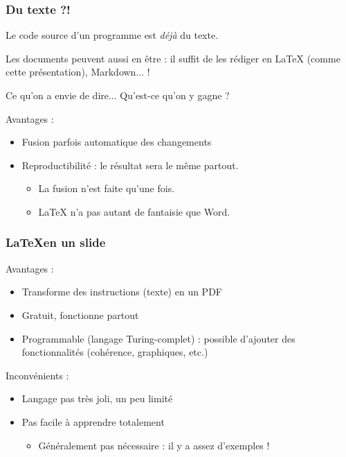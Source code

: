 \documentclass[compress]{beamer}
\newenvironment{envie}
	{\begin{block}{Ce qu'on a envie de dire...}}
	{\end{block}}
\begin{document}
\begin{frame}
	\frametitle{Du texte ?!}
	Le code source d'un programme est \emph{déjà} du texte.
	\pause

	Les documents peuvent aussi en être : il suffit de les rédiger en
	\LaTeX{} (comme cette présentation), Markdown... !
	\pause

	\begin{envie}
		Qu'est-ce qu'on y gagne ? \pause
	\end{envie}

	Avantages :
	\begin{itemize}
		\item Fusion parfois automatique des changements \pause
		\item Reproductibilité : le résultat sera le même partout. \pause
			\begin{itemize}
				\item La fusion n'est faite qu'une fois. \pause
				\item \LaTeX{} n'a pas autant de fantaisie que Word.
			\end{itemize}
	\end{itemize}
\end{frame}

\begin{frame}
	\frametitle{\LaTeX en un slide}
	Avantages :
	\begin{itemize}
		\item Transforme des instructions (texte) en un PDF
		\item Gratuit, fonctionne partout
		\item Programmable (langage Turing-complet) :
			possible d'ajouter des fonctionnalités
			(cohérence, graphiques, etc.)
	\end{itemize}
	Inconvénients :
	\begin{itemize}
		\item Langage pas très joli, un peu limité
		\item Pas facile à apprendre totalement
			\begin{itemize}
				\item Généralement pas nécessaire : il y a assez d'exemples !
			\end{itemize}
	\end{itemize}
\end{frame}
\end{document}
